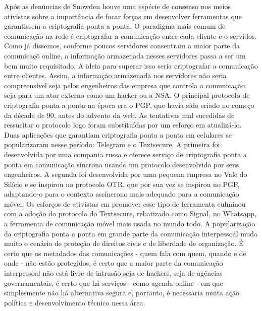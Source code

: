 Após as denúncias de Snowden houve uma espécie de consenso nos meios ativistas sobre a importância de focar forças em desenvolver ferramentas que garantissem a criptografia ponta a ponta.
O paradigma mais comum de comunicação na rede é criptografar a comunicação entre cada cliente e o servidor.
Como já dissemos, conforme poucos servidores consentram a maior parte da comunicaçõ online, a informação armazenada nesses servidores passa a ser um bem muito requisitado.
A ideia para superar isso seria criptografar a comunicação entre clientes.
Assim, a informação armazenada nos servidores não seria compreensível seja pelos engenheiros das empresa que controla a comunicação, seja para um ator externo como um hacker ou a NSA.
O principal protocolo de criptografia ponta a ponta na época era o PGP, que havia sido criado no começo da década de 90, antes do advento da web.
As tentativas mal sucedidas de ressucitar o protocolo logo foram substituídas por um esforço em atualizá-lo.
Duas aplicações que garantiam criptografia ponta a ponta em celulares se popularizaram nesse período: Telegram e o Textsecure.
A primeira foi desenvolvida por uma compania russa e oferece serviço de criptografia ponta a ponta em comunicação síncrona usando um protocolo desenvolvido por seus engenheiros.
A segunda foi desenvolvida por uma pequena empresa no Vale do Silício e se inspirou no protocolo OTR, que por sua vez se inspirou no PGP, adaptando-o para o contexto assíncrono mais adequado para a comunicação móvel.
Os esforços de ativistas em promover esse tipo de ferramenta culminou com a adoção do protocolo do Textsecure, rebatizado como Signal, no Whatsapp, a ferramenta de comunicação móvel mais usada no mundo todo.
A popularização da criptografia ponta a ponta em grande parte da comunicação interpessoal muda muito o cenário de proteção de direitos civis e de liberdade de organização.
É certo que os metadados das comunicações - quem fala com quem, quando e de onde - não estão protegidos, é certo que a maior parte da comunicação interpessoal não está livre de intrusão seja de hackers, seja de agências governamentais, é certo que há serviços - como agenda online - em que simplesmente não há alternativa segura e, portanto, é necessaria muita ação política e desenvolvimento técnico nessa área.